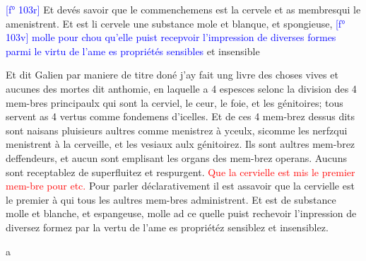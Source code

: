\documentclass[11pt,a4paper, twoside, openany]{memoir}
\newcommand{\folio}[1]{\textcolor{blue}{[f° #1]}}
\newcommand{\titre}[1]{\textcolor{red}{#1}}
\begin{document}
\begin{pairs}
\begin{Leftside}
\beginnumbering
\pstart
\folio{103r}
Et devés savoir que le commenchemens est la cervele
et as membresqui le amenistrent. Et est li cervele
une substance mole et blanque, et spongieuse, \folio{103v}
\textcolor{blue}{molle pour chou qu'elle puist recepvoir l’impression
de diverses formes parmi le virtu de l’ame es propriétés sensibles}
et insensible
\pend
\endnumbering
\end{Leftside}
\begin{Rightside}
\beginnumbering
\pstart
Et dit Galien par maniere de titre doné j'ay fait ung livre des choses vives et aucunes des mortes dit anthomie, en laquelle a 4 espesces selonc la division des 4 mem-bres principaulx qui sont la cerviel, le ceur, le foie, et les génitoires; tous servent as 4 vertus comme fondemens d'icelles. Et de ces 4 mem-brez dessus dits sont naisans pluisieurs aultres comme menistrez à yceulx, sicomme les nerfzqui menistrent à la cerveille, et les vesiaux aulx génitoirez. Ils sont aultres mem-brez deffendeurs,
et aucun sont emplisant les organs des mem-brez operans.
Aucuns sont receptablez de superfluitez et respurgent.
\titre{Que la cervielle est mis le premier mem-bre pour etc.}
Pour parler déclarativement il est assavoir que la cervielle est le premier à qui tous les
aultres mem-bres administrent. Et est de substance molle
et blanche, et espangeuse, molle ad ce quelle puist rechevoir
l'inpression de diversez formez par la vertu de l'ame es
propriétéz sensiblez et insensiblez.
\pend
\endnumbering
\end{Rightside}
\end{pairs}
\Columns
{}
\textcolor{reledmac@leftcolor}{a}
\end{document}
